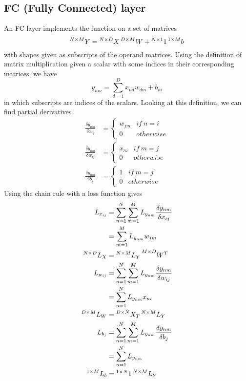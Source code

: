 \documentclass{article}
\numberwithin{equation}{subsection}
\begin{document}
\subsection{FC (Fully Connected) layer}
An FC layer implements the function on a set of matrices
\begin{equation}
    \prescript{N\times M}{}{Y} = \prescript{N\times D}{}{X}\prescript{D\times M}{}{W} + \prescript{N\times1}{}{1}\prescript{1\times M}{}{b}
\end{equation}
with shapes given as subscripts of the operand matrices. Using the definition of matrix multiplication given a scalar with some indices in their corresponding matrices, we have
\begin{equation}
y_{nm} = \sum_{d=1}^D x_{nd} w_{dm}+b_m
\end{equation}
in which subscripts are indices of the scalars. Looking at this definition, we can find partial derivatives 
\begin{align}
    \frac{\delta y_{nm}}{\delta x_{ij}} &= \begin{cases}
        w_{jm} & if\ n=i\\
        0 & otherwise
    \end{cases}\\
    \frac{\delta y_{nm}}{\delta w_{ij}} &= \begin{cases}
        x_{ni} & if\ m=j\\
        0 & otherwise
    \end{cases}\\
    \frac{\delta y_{nm}}{\delta b_{j}} &= \begin{cases}
        1 & if\ m=j\\
        0 & otherwise
    \end{cases}
\end{align}
Using the chain rule with a loss function gives
\begin{align}
    L_{x_{ij}} &= \sum_{n=1}^N\sum_{m=1}^M L_{y_{nm}} \frac{\delta y_{nm}}{\delta x_{ij}}\\
    &= \sum_{m=1}^M L_{y_{nm}} w_{jm}\\
    \prescript{N\times D}{}{L_X} &= \prescript{N\times M}{}{L_Y}\prescript{M\times D}{}{W^T}\\
    L_{w_{ij}} &= \sum_{n=1}^N\sum_{m=1}^M L_{y_{nm}} \frac{\delta y_{nm}}{\delta w_{ij}}\\
    &= \sum_{n=1}^N L_{y_{nm}} x_{ni}\\
    \prescript{D\times M}{}{L_W} &= \prescript{D\times N}{}{X_T}\prescript{N\times M}{}{L_Y}\\
    L_{b_{j}} &= \sum_{n=1}^N\sum_{m=1}^M L_{y_{nm}} \frac{\delta y_{nm}}{\delta b_{j}}\\
    &= \sum_{n=1}^N L_{y_{nm}}\\
    \prescript{1\times M}{}{L_b} &= \prescript{1\times N}{}{1}\prescript{N\times M}{}{L_Y}
\end{align}
\end{document}
